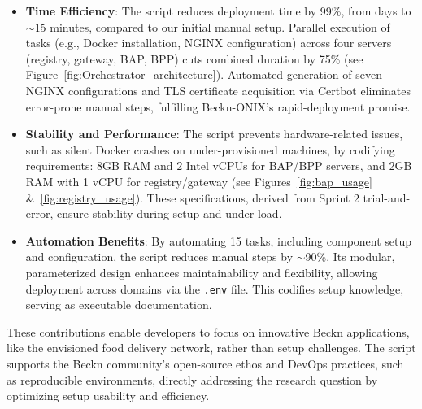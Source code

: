 \begin{itemize}
    \item \textbf{Time Efficiency}: The script reduces deployment time by 99\%, from days to $\sim$15 minutes, compared to our initial manual setup. Parallel execution of tasks (e.g., Docker installation, NGINX configuration) across four servers (registry, gateway, BAP, BPP) cuts combined duration by 75\% (see Figure~\ref{fig:Orchestrator_architecture}). Automated generation of seven NGINX configurations and TLS certificate acquisition via Certbot eliminates error-prone manual steps, fulfilling Beckn-ONIX’s rapid-deployment promise.
    \item \textbf{Stability and Performance}: The script prevents hardware-related issues, such as silent Docker crashes on under-provisioned machines, by codifying requirements: 8GB RAM and 2 Intel vCPUs for BAP/BPP servers, and 2GB RAM with 1 vCPU for registry/gateway (see Figures~\ref{fig:bap_usage} \&~\ref{fig:registry_usage}). These specifications, derived from Sprint 2 trial-and-error, ensure stability during setup and under load.
    \item \textbf{Automation Benefits}: By automating 15 tasks, including component setup and configuration, the script reduces manual steps by $\sim$90\%. Its modular, parameterized design enhances maintainability and flexibility, allowing deployment across domains via the \texttt{.env} file. This codifies setup knowledge, serving as executable documentation.
\end{itemize}

These contributions enable developers to focus on innovative Beckn applications, like the envisioned food delivery network, rather than setup challenges. The script supports the Beckn community’s open-source ethos and DevOps practices, such as reproducible environments, directly addressing the research question by optimizing setup usability and efficiency.